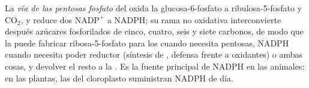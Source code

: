 \begin{definition}\label{def:b1:biosyntheses-integration:ppp}
La \emph{vía de las pentosas fosfato} del  oxida la
glucosa-6-fosfato a ribulosa-5-fosfato y $\mathrm{CO_2}$, y reduce dos
$\mathrm{NADP^+}$ a NADPH; su rama no oxidativa interconvierte después
azúcares fosforilados de cinco, cuatro, seis y siete carbonos, de modo que
la  puede fabricar ribosa-5-fosfato para los  cuando
necesita pentosas, NADPH cuando necesita poder reductor (síntesis de ,
defensa frente a oxidantes) o ambas cosas, y devolver el resto a la
. Es la fuente principal de NADPH en las  animales; en las
plantas, las  del cloroplasto suministran NADPH de día.
\end{definition}

